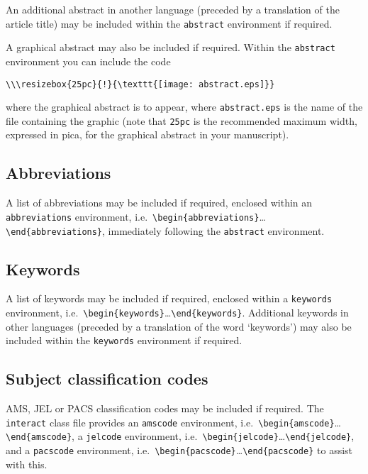 \documentclass[]{interact}
\theoremstyle{plain}%
\theoremstyle{definition}
\theoremstyle{remark}
\begin{document}
An additional abstract in another language (preceded by a translation of the article title) may be included within the \verb"abstract" environment if required.

A graphical abstract may also be included if required. Within the \verb"abstract" environment you can include the code
\begin{verbatim}
\\\resizebox{25pc}{!}{\texttt{[image: abstract.eps]}}
\end{verbatim}
where the graphical abstract is to appear, where \verb"abstract.eps" is the name of the file containing the graphic (note that \verb"25pc" is the recommended maximum width, expressed in pica, for the graphical abstract in your manuscript).


\subsection{Abbreviations}

A list of abbreviations may be included if required, enclosed within an \texttt{abbreviations} environment, i.e.\ \verb"\begin{abbreviations}"\ldots\verb"\end{abbreviations}", immediately following the \verb"abstract" environment.


\subsection{Keywords}

A list of keywords may be included if required, enclosed within a \texttt{keywords} environment, i.e.\ \verb"\begin{keywords}"\ldots\verb"\end{keywords}". Additional keywords in other languages (preceded by a translation of the word `keywords') may also be included within the \verb"keywords" environment if required.


\subsection{Subject classification codes}

AMS, JEL or PACS classification codes may be included if required. The \texttt{interact} class file provides an \texttt{amscode} environment, i.e.\ \verb"\begin{amscode}"\ldots\verb"\end{amscode}", a \texttt{jelcode} environment, i.e.\ \verb"\begin{jelcode}"\ldots\verb"\end{jelcode}", and a \texttt{pacscode} environment, i.e.\ \verb"\begin{pacscode}"\ldots\verb"\end{pacscode}" to assist with this.
\end{document}
